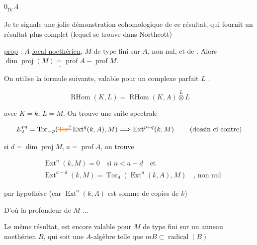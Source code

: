 $0_{\overline{\underline{\mathrm{IV}}}}$.4

Je te signale une jolie démonstration cohomologique de ce résultat, qui fournit un résultat plus complet (lequel se trouve dans Northcott)


\uline{prop} : $A$ \uline{local noethérien}, $M$ de type fini sur $A$, non nul, et de . Alors $\underline{\dim\operatorname{proj}(M)=\operatorname{prof} A-\operatorname{prof} M}$.

On utilise la formule suivante, valable pour un complexe parfait $L$ .

\[
\operatorname{RHom}(K,L)=\operatorname{RHom}(K,A)\overset{L}{\otimes}L
\]

avec $K=k$, $L=M$. On trouve une suite spectrale

\[
E_2^{pq}=\operatorname{Tor}_{-p}(\deleted{\unsure{\operatorname{Tor}}}\operatorname{Ext}^{q}(k,A),M)\Longrightarrow \operatorname{Ext}^{p+q}(k,M).\qquad \text{(dessin ci contre)}
\]


si $d=\dim\operatorname{proj}M$, $a=\operatorname{prof}A$, on trouve

\[
\begin{aligned}
&\operatorname{Ext}^{n}(k,M)=0\quad\text{si }n<a-d\quad\text{et}\\
&\operatorname{Ext}^{a-d}(k,M)=\operatorname{Tor}_d(\operatorname{Ext}^a(k,A),M)\quad\text{, non nul}
\end{aligned}
\]

par hypothèse (car $\operatorname{Ext}^a(k,A)$ est somme de copies de $k$)

D'où la profondeur de $M$ ...


Le même résultat,  est encore valable pour $M$ de type fini sur un anneau  noethérien $B$, qui soit une $A$-algèbre telle que $mB\subset\operatorname{radical}(B)$

